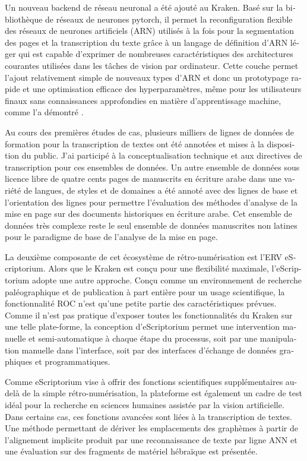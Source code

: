 \begin{french}
Un nouveau backend de réseau neuronal a été ajouté au Kraken. Basé sur la
bibliothèque de réseaux de neurones pytorch, il permet la reconfiguration
flexible des réseaux de neurones artificiels (ARN) utilisés à la fois pour la
segmentation des pages et la transcription du texte grâce à un langage de
définition d'ARN léger qui est capable d'exprimer de nombreuses
caractéristiques des architectures courantes utilisées dans les tâches de
vision par ordinateur. Cette couche permet l'ajout relativement simple de
nouveaux types d'ARN et donc un prototypage rapide et une optimisation efficace
des hyperparamètres, même pour les utilisateurs finaux sans connaissances
approfondies en matière d'apprentissage machine, comme l'a démontré
\cite{strobel2020much}.

Au cours des premières études de cas, plusieurs milliers de lignes de données
de formation pour la transcription de textes ont été annotées et mises à la
disposition du public. J'ai participé à la conceptualisation technique et aux
directives de transcription pour ces ensembles de données. Un autre ensemble de
données sous licence libre de quatre cents pages de manuscrits en écriture
arabe dans une variété de langues, de styles et de domaines a été annoté avec
des lignes de base et l'orientation des lignes pour permettre l'évaluation des
méthodes d'analyse de la mise en page sur des documents historiques en écriture
arabe.  Cet ensemble de données très complexe reste le seul ensemble de données
manuscrites non latines pour le paradigme de base de l'analyse de la mise en
page.

La deuxième composante de cet écosystème de rétro-numérisation est l'ERV
eScriptorium.  Alors que le Kraken est conçu pour une flexibilité maximale,
l'eScriptorium adopte une autre approche. Conçu comme un environnement de
recherche paléographique et de publication à part entière pour un usage
scientifique, la fonctionnalité ROC n'est qu'une petite partie des
caractéristiques prévues. Comme il n'est pas pratique d'exposer toutes les
fonctionnalités du Kraken sur une telle plate-forme, la conception
d'eScriptorium permet une intervention manuelle et semi-automatique à chaque
étape du processus, soit par une manipulation manuelle dans l'interface, soit
par des interfaces d'échange de données graphiques et programmatiques.

Comme eScriptorium vise à offrir des fonctions scientifiques supplémentaires
au-delà de la simple rétro-numérisation, la plateforme est également un cadre
de test idéal pour la recherche en sciences humaines assistée par la vision
artificielle. Dans certains cas, ces fonctions avancées sont liées à la
transcription de textes. Une méthode permettant de dériver les emplacements des
graphèmes à partir de l'alignement implicite produit par une reconnaissance de
texte par ligne ANN et une évaluation sur des fragments de matériel hébraïque
est présentée.


\end{french}
